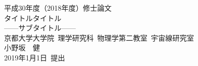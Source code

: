 \begin{titlepage}
\begin{spacing}{2.3}

\begin{center}
\vspace*{80truept}
{\huge 平成30年度（2018年度）修士論文}\\
\vspace{30truept}
{\huge タイトルタイトル}\\ %
{\LARGE ------サブタイトル------}\\ %
\vspace{100truept}
{\large 京都大学大学院\ 理学研究科\ 物理学第二教室\ 宇宙線研究室}\\ %
{\LARGE 小野坂　健}\\ %
{\LARGE 2019年1月1日\ 提出}\\ %

\end{center}

\end{spacing}
\end{titlepage}